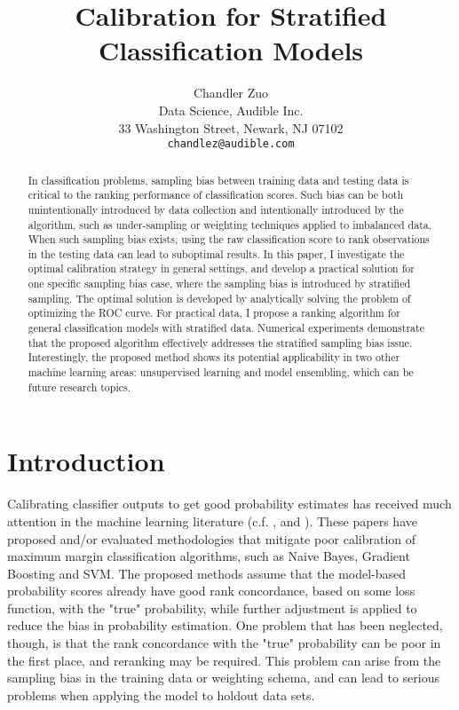 \documentclass{article} %
\title{Calibration for Stratified Classification Models}
\author{
Chandler Zuo \\
Data Science, Audible Inc.\\
33 Washington Street, Newark, NJ 07102 \\
\texttt{chandlez@audible.com} \\
}
\begin{document}
\maketitle

\begin{abstract}
In classification problems, sampling bias between training data and testing data is critical to the ranking performance of classification scores. Such bias can be both unintentionally introduced by data collection and intentionally introduced by the algorithm, such as under-sampling or weighting techniques applied to imbalanced data. When such sampling bias exists, using the raw classification score to rank observations in the testing data can lead to suboptimal results. In this paper, I investigate the optimal calibration strategy in general settings, and develop a practical solution for one specific sampling bias case, where the sampling bias is introduced by stratified sampling. The optimal solution is developed by analytically solving the problem of optimizing the ROC curve. For practical data, I propose a ranking algorithm for general classification models with stratified data. Numerical experiments demonstrate that the proposed algorithm effectively addresses the stratified sampling bias issue. Interestingly, the proposed method shows its potential applicability in two other machine learning areas: unsupervised learning and model ensembling, which can be future research topics.
\end{abstract}

\section{Introduction}\label{sec:introduction}

Calibrating classifier outputs to get good probability estimates has received much attention in the machine learning literature (c.f. \cite{niculescu2005obtaining}, \cite{niculescu2005predicting} and \cite{zadrozny2002transforming}). These papers have proposed and/or evaluated methodologies that mitigate poor calibration of maximum margin classification algorithms, such as Naive Bayes, Gradient Boosting and SVM. The proposed methods assume that the model-based probability scores already have good rank concordance, based on some loss function, with the "true" probability, while further adjustment is applied to reduce the bias in probability estimation. One problem that has been neglected, though, is that the rank concordance with the "true" probability can be poor in the first place, and reranking may be required. This problem can arise from the sampling bias in the training data or weighting schema, and can lead to serious problems when applying the model to holdout data sets.
\end{document}
